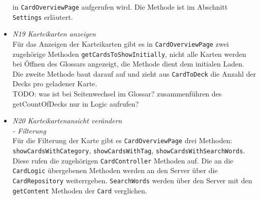\documentclass[fontsize=12pt,paper=A4,twoside]{scrartcl}
\begin{document}
\begin{itemize}
    in \texttt{CardOverviewPage} aufgerufen wird. Die Methode ist im Abschnitt \texttt{Settings} erläutert.
    \item \textit{N19 Karteikarten anzeigen}\\ Für das Anzeigen der Karteikarten gibt es in \texttt{CardOverviewPage} zwei zugehörige Methoden
    \texttt{getCardsToShowInitially}, nicht alle Karten werden bei Öffnen
    des Glossars angezeigt, die Methode dient dem initialen Laden. Die zweite Methode baut darauf auf und zieht aus \texttt{CardToDeck} die Anzahl der
    Decks pro geladener Karte. \\
    TODO: was ist bei Seitenwechsel im Glossar? zusammenführen des getCountOfDecks nur in Logic aufrufen?
    \item \textit{N20 Karteikartenansicht verändern\\- Filterung}\\
    Für die Filterung der Karte gibt es \texttt{CardOverviewPage} drei Methoden:
    \texttt{showCardsWithCategory}, \texttt{showCardsWithTag}, \texttt{showCardsWithSearchWords}. Diese rufen die zugehörigen \texttt{CardController} Methoden auf. Die an
    die \texttt{CardLogic} übergebenen Methoden werden an den Server über die \texttt{CardRepository} weiterrgeben. \texttt{SearchWords} werden über
    den Server mit den \texttt{getContent} Methoden der \texttt{Card} verglichen.
    \end{itemize}
\end{document}
